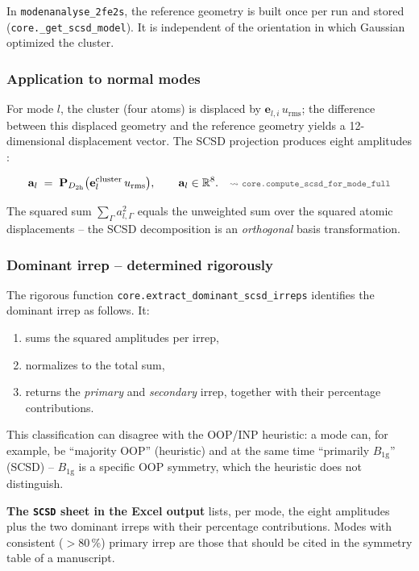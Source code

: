 \documentclass[11pt,a4paper,twoside]{article}
\newcommand{\evec}{\mathbf{e}}
\newcommand{\urms}{u_{\mathrm{rms}}}
\newcommand{\Bgi}[1]{B_{\mathrm{#1g}}}
\newcommand{\codref}[1]{%
  \quad\text{\textcolor{gray!70!black}{\footnotesize $\rightsquigarrow$~\texttt{#1}}}}
\theoremstyle{remark}
\begin{document}
In \texttt{modenanalyse\_2fe2s}, the reference geometry is built once
per run and stored (\texttt{core.\_get\_scsd\_model}). It is
independent of the orientation in which Gaussian optimized the
cluster.

\subsubsection*{Application to normal modes}

For mode $l$, the cluster (four atoms) is displaced by $\evec_{l,i}\,\urms$;
the difference between this displaced geometry and the reference
geometry yields a 12-dimensional displacement vector. The SCSD
projection produces eight amplitudes \cite{Kingsbury2024}:

\begin{equation}
  \mathbf{a}_l \;=\;
  \mathbf{P}_{D_{2\mathrm{h}}}\bigl(\evec_l^{\text{cluster}} \,\urms\bigr) ,
  \qquad
  \mathbf{a}_l \in \mathbb{R}^8 .
  \codref{core.compute\_scsd\_for\_mode\_full}
  \label{eq:scsd-projection}
\end{equation}

The squared sum $\sum_\Gamma a_{l,\Gamma}^2$ equals the unweighted
sum over the squared atomic displacements -- the SCSD decomposition
is an \emph{orthogonal} basis transformation.

\subsubsection*{Dominant irrep -- determined rigorously}
\label{sec:scsd-rigoros}

The rigorous function \texttt{core.extract\_dominant\_scsd\_irreps}
identifies the dominant irrep as follows. It:

\begin{enumerate}
  \item sums the squared amplitudes per irrep,
  \item normalizes to the total sum,
  \item returns the \emph{primary} and \emph{secondary} irrep,
        together with their percentage contributions.
\end{enumerate}

This classification can disagree with the OOP/INP heuristic: a mode
can, for example, be ``majority OOP'' (heuristic) and at the same
time ``primarily $\Bgi{1}$'' (SCSD) -- $\Bgi{1}$ is a specific
OOP symmetry, which the heuristic does not distinguish.

\begin{infobox}
\textbf{The \texttt{SCSD} sheet in the Excel output} lists, per mode,
the eight amplitudes plus the two dominant irreps with their
percentage contributions. Modes with consistent ($>$80\,\%) primary
irrep are those that should be cited in the symmetry table of a
manuscript.
\end{infobox}
\end{document}
